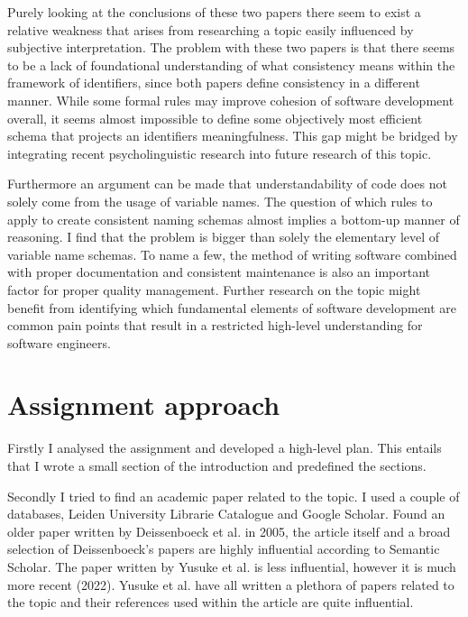 \documentclass[a4paper,12pt]{article}
\begin{document}
\begin{multicols}{2}
    Purely looking at the conclusions of these two papers there seem to exist a relative weakness that arises from
    researching a topic easily influenced by subjective interpretation. The problem with these two papers is that there
    seems to be a lack of foundational
    understanding of what consistency means within the framework of identifiers, since both papers define consistency
    in a
    different manner. While some formal rules may improve cohesion of software development overall, it seems almost
    impossible to define some objectively most efficient schema that projects an identifiers meaningfulness.	This
    gap might be bridged by integrating recent psycholinguistic research into future research of
    this topic.

    Furthermore an argument can be made that understandability of code does not solely come from the usage of variable
    names. The question of which rules to apply to create consistent naming schemas almost implies a bottom-up manner
    of reasoning. I find that the problem is bigger than solely the elementary level of variable name schemas. To name
    a few, the
    method of
    writing software combined with proper documentation and consistent maintenance is also an important factor for
    proper quality management. Further research on the topic
    might
    benefit from identifying which fundamental elements of software development are common pain points that result in a
    restricted high-level understanding for software engineers.

    \section*{Assignment approach}
    Firstly I analysed the assignment and developed a high-level plan. This entails that I wrote a small section of the
    introduction and predefined the sections.

    Secondly I tried to find an academic paper related to the topic. I used a couple of databases, Leiden University
    Librarie Catalogue and Google Scholar. Found an older paper written by Deissenboeck et al. in 2005, the article
    itself
    and a broad selection of Deissenboeck's papers are highly influential according to Semantic Scholar. The paper
    written
    by Yusuke et al. is less influential, however it is much more recent (2022). Yusuke et al. have all written a
    plethora
    of papers related to the topic and their references used within the article are quite influential.


\end{multicols}
\end{document}
